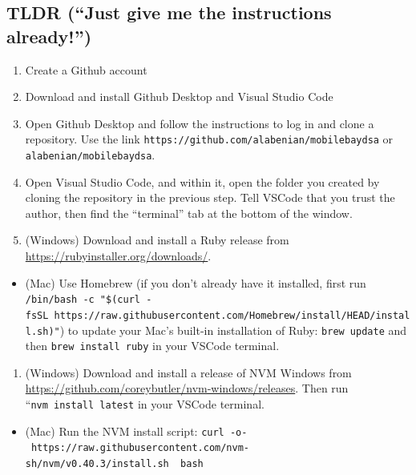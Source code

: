 \documentclass[
]{book}
\providecommand{\tightlist}{%
  \setlength{\itemsep}{0pt}\setlength{\parskip}{0pt}}
\begin{document}
\subsection{TLDR (``Just give me the instructions already!'')}\label{tldr-just-give-me-the-instructions-already}

\begin{enumerate}
\def\labelenumi{\arabic{enumi}.}
\tightlist
\item
  Create a Github account
\item
  Download and install Github Desktop and Visual Studio Code
\item
  Open Github Desktop and follow the instructions to log in and clone a repository. Use the link \texttt{https://github.com/alabenian/mobilebaydsa} or \texttt{alabenian/mobilebaydsa}.
\item
  Open Visual Studio Code, and within it, open the folder you created by cloning the repository in the previous step. Tell VSCode that you trust the author, then find the ``terminal'' tab at the bottom of the window.
\item
  (Windows) Download and install a Ruby release from \url{https://rubyinstaller.org/downloads/}.
\end{enumerate}

\begin{itemize}
\tightlist
\item
  (Mac) Use Homebrew (if you don't already have it installed, first run \texttt{/bin/bash\ -c\ "\$(curl\ -fsSL\ https://raw.githubusercontent.com/Homebrew/install/HEAD/install.sh)"}) to update your Mac's built-in installation of Ruby: \texttt{brew\ update} and then \texttt{brew\ install\ ruby} in your VSCode terminal.
\end{itemize}

\begin{enumerate}
\def\labelenumi{\arabic{enumi}.}
\setcounter{enumi}{5}
\tightlist
\item
  (Windows) Download and install a release of NVM Windows from \url{https://github.com/coreybutler/nvm-windows/releases}. Then run ``\texttt{nvm\ install\ latest} in your VSCode terminal.
\end{enumerate}

\begin{itemize}
\tightlist
\item
  (Mac) Run the NVM install script: \texttt{curl\ -o-\ https://raw.githubusercontent.com/nvm-sh/nvm/v0.40.3/install.sh\ \textbar{}\ bash}
\end{itemize}
\end{document}
